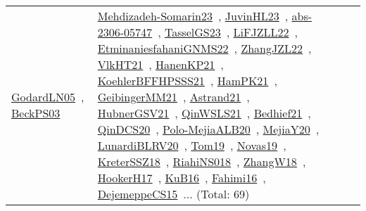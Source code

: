{\begin{longtable}{lp{3cm}>{\raggedright\arraybackslash}p{6cm}>{\raggedright\arraybackslash}p{6cm}>{\raggedright\arraybackslash}p{8cm}}
\href{works/GodardLN05.pdf}{GodardLN05}~\cite{GodardLN05}, \href{works/BeckPS03.pdf}{BeckPS03}~\cite{BeckPS03} & \href{works/Mehdizadeh-Somarin23.pdf}{Mehdizadeh-Somarin23}~\cite{Mehdizadeh-Somarin23}, \href{works/JuvinHL23.pdf}{JuvinHL23}~\cite{JuvinHL23}, \href{works/abs-2306-05747.pdf}{abs-2306-05747}~\cite{abs-2306-05747}, \href{works/TasselGS23.pdf}{TasselGS23}~\cite{TasselGS23}, \href{works/LiFJZLL22.pdf}{LiFJZLL22}~\cite{LiFJZLL22}, \href{works/EtminaniesfahaniGNMS22.pdf}{EtminaniesfahaniGNMS22}~\cite{EtminaniesfahaniGNMS22}, \href{works/ZhangJZL22.pdf}{ZhangJZL22}~\cite{ZhangJZL22}, \href{works/VlkHT21.pdf}{VlkHT21}~\cite{VlkHT21}, \href{works/HanenKP21.pdf}{HanenKP21}~\cite{HanenKP21}, \href{works/KoehlerBFFHPSSS21.pdf}{KoehlerBFFHPSSS21}~\cite{KoehlerBFFHPSSS21}, \href{works/HamPK21.pdf}{HamPK21}~\cite{HamPK21}, \href{works/GeibingerMM21.pdf}{GeibingerMM21}~\cite{GeibingerMM21}, \href{works/Astrand21.pdf}{Astrand21}~\cite{Astrand21}, \href{works/HubnerGSV21.pdf}{HubnerGSV21}~\cite{HubnerGSV21}, \href{works/QinWSLS21.pdf}{QinWSLS21}~\cite{QinWSLS21}, \href{works/Bedhief21.pdf}{Bedhief21}~\cite{Bedhief21}, \href{works/QinDCS20.pdf}{QinDCS20}~\cite{QinDCS20}, \href{works/Polo-MejiaALB20.pdf}{Polo-MejiaALB20}~\cite{Polo-MejiaALB20}, \href{works/MejiaY20.pdf}{MejiaY20}~\cite{MejiaY20}, \href{works/LunardiBLRV20.pdf}{LunardiBLRV20}~\cite{LunardiBLRV20}, \href{works/Tom19.pdf}{Tom19}~\cite{Tom19}, \href{works/Novas19.pdf}{Novas19}~\cite{Novas19}, \href{works/KreterSSZ18.pdf}{KreterSSZ18}~\cite{KreterSSZ18}, \href{works/RiahiNS018.pdf}{RiahiNS018}~\cite{RiahiNS018}, \href{works/ZhangW18.pdf}{ZhangW18}~\cite{ZhangW18}, \href{works/HookerH17.pdf}{HookerH17}~\cite{HookerH17}, \href{works/KuB16.pdf}{KuB16}~\cite{KuB16}, \href{works/Fahimi16.pdf}{Fahimi16}~\cite{Fahimi16}, \href{works/DejemeppeCS15.pdf}{DejemeppeCS15}~\cite{DejemeppeCS15}... (Total: 69)\\

\end{longtable}}
